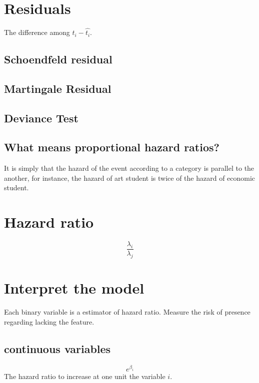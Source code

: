 \documentclass[10pt,a4paper]{article}
\begin{document}
\section{Residuals}
The difference among $t_{i} - \hat{t_{i}}$.

\subsection{Schoendfeld residual}


\subsection{Martingale Residual}


\subsection{Deviance Test}




\subsection{What means proportional hazard ratios?}
It is simply that the hazard of the event according to a category is parallel to the another, for instance, the hazard of art student is twice of the hazard of economic student. 



\section{Hazard ratio}

\begin{equation}
\frac{\lambda_{i}}{\lambda_{j}}
\end{equation}

\section{Interpret the model}
Each binary variable is a estimator of hazard ratio. Measure the risk of presence regarding lacking the feature.

\subsection{continuous variables}

\begin{equation}
e^{\beta_{i}}
\end{equation}
The hazard ratio to increase at one unit the variable $i$.
\end{document}
